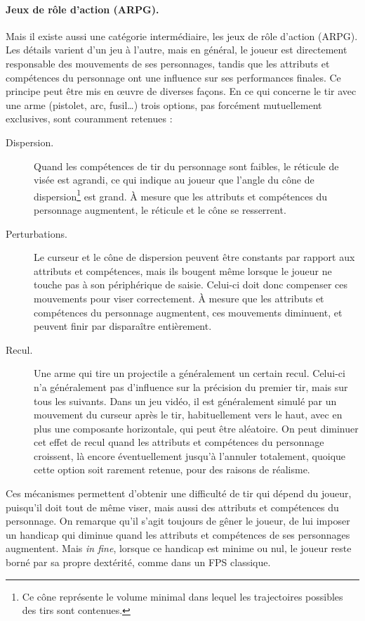 	\paragraph{Jeux de rôle d'action (ARPG).}
	Mais il existe aussi une catégorie intermédiaire, les jeux de rôle d'action (ARPG). Les détails varient d'un jeu à l'autre, mais en général, le joueur est directement responsable des mouvements de ses personnages, tandis que les attributs et compétences du personnage ont une influence sur ses performances finales. Ce principe peut être mis en œuvre de diverses façons. En ce qui concerne le tir avec une arme (pistolet, arc, fusil\ldots{}) trois options, pas forcément mutuellement exclusives, sont couramment retenues :
	\begin{description}
		\item[Dispersion.] Quand les compétences de tir du personnage sont faibles, le réticule de visée est agrandi, ce qui indique au joueur que l'angle du cône de dispersion\footnote{Ce cône représente le volume minimal dans lequel les trajectoires possibles des tirs sont contenues.} est grand. À mesure que les attributs et compétences du personnage augmentent, le réticule et le cône se resserrent.
		\item[Perturbations.] Le curseur et le cône de dispersion peuvent être constants par rapport aux attributs et compétences, mais ils bougent même lorsque le joueur ne touche pas à son périphérique de saisie. Celui-ci doit donc compenser ces mouvements pour viser correctement. À mesure que les attributs et compétences du personnage augmentent, ces mouvements diminuent, et peuvent finir par disparaître entièrement.
		\item[Recul.] Une arme qui tire un projectile a généralement un certain recul. Celui-ci n'a généralement pas d'influence sur la précision du premier tir, mais sur tous les suivants. Dans un jeu vidéo, il est généralement simulé par un mouvement du curseur après le tir, habituellement vers le haut, avec en plus une composante horizontale, qui peut être aléatoire. On peut diminuer cet effet de recul quand les attributs et compétences du personnage croissent, là encore éventuellement jusqu'à l'annuler totalement, quoique cette option soit rarement retenue, pour des raisons de réalisme.
	\end{description}


	Ces mécanismes permettent d'obtenir une difficulté de tir qui dépend du joueur, puisqu'il doit tout de même viser, mais aussi des attributs et compétences du personnage. On remarque qu'il s'agit toujours de gêner le joueur, de lui imposer un handicap qui diminue quand les attributs et compétences de ses personnages augmentent. Mais \emph{in fine}, lorsque ce handicap est minime ou nul, le joueur reste borné par sa propre dextérité, comme dans un FPS classique.
	
